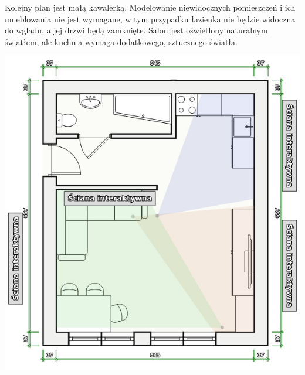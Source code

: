 \documentclass{article} %
\begin{document}
        
        Kolejny plan jest małą kawalerką. Modelowanie niewidocznych pomieszczeń i ich umeblowania nie jest wymagane, w tym przypadku łazienka nie będzie widoczna do wglądu, a jej drzwi będą zamknięte. Salon jest oświetlony naturalnym światłem, ale kuchnia wymaga dodatkowego, sztucznego światła.
        \\
        \begin{center}
            \includegraphics[scale=0.5]{images/diagrams/kawalerka.jpeg}
        \end{center}
\end{document}
